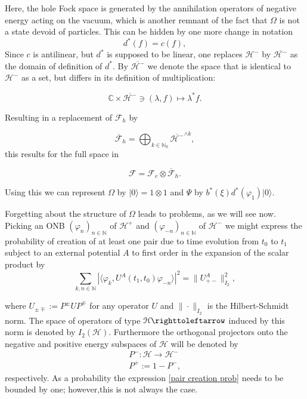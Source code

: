 \documentclass[b5paper,draft,openbib,12pt]{memoir}
\begin{document}
Here, the hole Fock space is generated by the annihilation 
operators of negative energy acting on the vacuum, which is 
another remnant of 
the fact that \(\Omega\) is not a state devoid of particles.
This can be hidden by one more change in notation
\begin{equation}
d^*(f)= c(f),
\end{equation}
Since \(c\) is antilinear, but \(d^*\) is supposed to be linear, one 
replaces \(\mathcal{H}^-\) by \(\overline{\mathcal{H}^-}\) as the domain of definition of \(d^*\).
By \(\overline{\mathcal{H}^-}\) we denote the space that is identical to 
\(\mathcal{H}^-\) as a set, but differs in its definition of multiplication:

\begin{equation}
\mathbb{C}\times \overline{\mathcal{H}^-} \ni (\lambda, f)\mapsto \lambda^* f.
\end{equation}

Resulting in a replacement of \(\mathcal{F}_h\) by 

\begin{equation}
\overline{\mathcal{F}}_h=\bigoplus_{k\in\mathbb{N}_0} \overline{\mathcal{H}^-}^{\wedge k},
\end{equation}
this results for the full space in 

\begin{equation}
\mathcal{F}= \mathcal{F}_e \otimes \overline{\mathcal{F}}_h.
\end{equation}

Using this we can represent \(\Omega\) by \(|0\rangle = 1\otimes 1\)
and \(\Psi\) by \(b^*(\xi)d^*(\varphi_1)|0\rangle \). 

Forgetting about the structure of \(\Omega\) leads to problems, 
as we will see now. Picking an ONB \((\varphi_{n})_{n\in\mathbb{N}}\)
of \(\mathcal{H}^+\) and \((\varphi_{-n})_{n\in\mathbb{N}}\)
of \(\mathcal{H}^-\) we might express the probability of 
creation of at least one pair due to time evolution from \(t_0\)
to \(t_1\)  
subject to an external 
potential \(A\) to first order in the expansion of 
the scalar product by 
\begin{equation}\label{pair creation prob}
\sum_{k,n\in\mathbb{N}}|\langle \varphi_k,U^A(t_1,t_0) \varphi_{-n}\rangle|^2
=\|U^A_{+-}\|^2_{I_2},
\end{equation}

where \(U_{\pm \mp}:= P^\pm U P^\mp\) for any operator \(U\)
and \(\|\cdot\|_{I_2}\) is the Hilbert-Schmidt norm. The space of 
operators of type \(\mathcal{H}\righttoleftarrow\) induced by this norm 
is denoted by \(I_2(\mathcal{H})\).
Furthermore the orthogonal projectors onto the negative and
positive energy
subspaces of \(\mathcal{H}\) will be denoted by 
\begin{align}\label{def: Ppm}
P^-:\mathcal{H}\rightarrow \mathcal{H}^-\\
P^+:=1-P^-,
\end{align}
respectively.
As a probability the expression \eqref{pair creation prob} needs to 
be bounded by one; however,this is not always the case.
\end{document}

